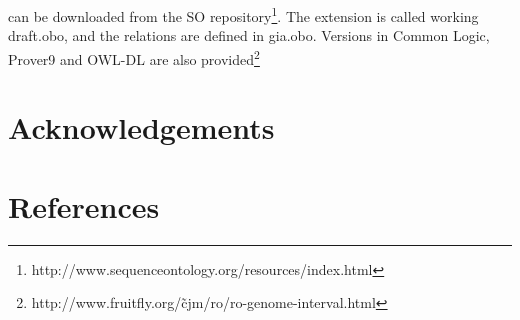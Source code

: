 \documentclass{article}
\def\SOGI{\pr{SO$^{+}$}}
\begin{document}
\SOGI can be downloaded from the SO
repository\footnote{http://www.sequenceontology.org/resources/index.html}. The
extension is called working draft.obo, and the relations are defined
in gia.obo. Versions in Common Logic, Prover9 and OWL-DL are also provided\footnote{http://www.fruitfly.org/\~cjm/ro/ro-genome-interval.html}

\section{Acknowledgements}



\section{References}



%


\end{document}
